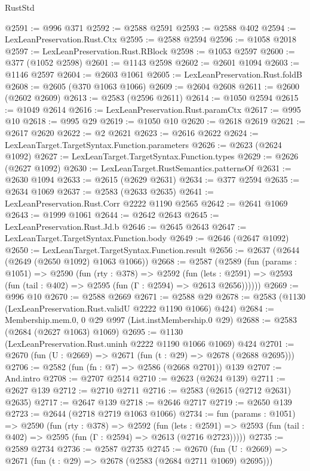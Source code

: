 \begin{lexlean}{RustStd}
\begin{coremodule}
@2591 := @996 @371
@2592 := @2588 @2591
@2593 := @2588 @402
@2594 := LexLeanPreservation.Rust.Ctx
@2595 := @2588 @2594
@2596 := @1058 @2018
@2597 := LexLeanPreservation.Rust.RBlock
@2598 := @1053 @2597
@2600 := @377 (@1052 @2598)
@2601 := @1143 @2598
@2602 := @2601 @1094
@2603 := @1146 @2597
@2604 := @2603 @1061
@2605 := LexLeanPreservation.Rust.foldB
@2608 := @2605 (@370 @1063 @1066)
@2609 := @2604 @2608
@2611 := @2600 (@2602 @2609)
@2613 := @2583 (@2596 @2611)
@2614 := @1050 @2594
@2615 := @1049 @2614
@2616 := LexLeanPreservation.Rust.paramCtx
@2617 := @995 @10
@2618 := @995 @29
@2619 := @1050 @10
@2620 := @2618 @2619
@2621 := @2617 @2620
@2622 := @2 @2621
@2623 := @2616 @2622
@2624 := LexLeanTarget.TargetSyntax.Function.parameters
@2626 := @2623 (@2624 @1092)
@2627 := LexLeanTarget.TargetSyntax.Function.types
@2629 := @2626 (@2627 @1092)
@2630 := LexLeanTarget.RustSemantics.patternsOf
@2631 := @2630 @1094
@2633 := @2615 (@2629 @2631)
@2634 := @377 @2594
@2635 := @2634 @1069
@2637 := @2583 (@2633 @2635)
@2641 := LexLeanPreservation.Rust.Corr @2222 @1190 @2565
@2642 := @2641 @1069
@2643 := @1999 @1061
@2644 := @2642 @2643
@2645 := LexLeanPreservation.Rust.Jd.b
@2646 := @2645 @2643
@2647 := LexLeanTarget.TargetSyntax.Function.body
@2649 := @2646 (@2647 @1092)
@2650 := LexLeanTarget.TargetSyntax.Function.result
@2656 := @2637 (@2644 (@2649 (@2650 @1092) @1063 @1066))
@2668 := @2587
    (@2589
      (fun (params : @1051) =>
      @2590
        (fun (rty : @378) =>
        @2592
          (fun (lets : @2591) =>
          @2593 (fun (tail : @402) => @2595 (fun (Γ : @2594) => @2613 @2656))))))
@2669 := @996 @10
@2670 := @2588 @2669
@2671 := @2588 @29
@2678 := @2583 (@1130 (LexLeanPreservation.Rust.validU @2222 @1190 @1066) @424)
@2684 := Membership.mem.{0, 0} @29 @997 (List.instMembership.{0} @29)
@2688 := @2583 (@2684 (@2627 @1063) @1069)
@2695 := @1130 (LexLeanPreservation.Rust.uninh @2222 @1190 @1066 @1069) @424
@2701 := @2670 (fun (U : @2669) => @2671 (fun (t : @29) => @2678 (@2688 @2695)))
@2706 := @2582 (fun (fn : @7) => @2586 (@2668 @2701)) @139
@2707 := And.intro
@2708 := @2707 @2514
@2710 := @2623 (@2624 @139)
@2711 := @2627 @139
@2712 := @2710 @2711
@2716 := @2583 (@2615 (@2712 @2631) @2635)
@2717 := @2647 @139
@2718 := @2646 @2717
@2719 := @2650 @139
@2723 := @2644 (@2718 @2719 @1063 @1066)
@2734 := fun (params : @1051) =>
  @2590
    (fun (rty : @378) =>
    @2592
      (fun (lets : @2591) =>
      @2593 (fun (tail : @402) => @2595 (fun (Γ : @2594) => @2613 (@2716 @2723)))))
@2735 := @2589 @2734
@2736 := @2587 @2735
@2745 := @2670 (fun (U : @2669) => @2671 (fun (t : @29) => @2678 (@2583 (@2684 @2711 @1069) @2695)))

\end{coremodule}
\end{lexlean}
